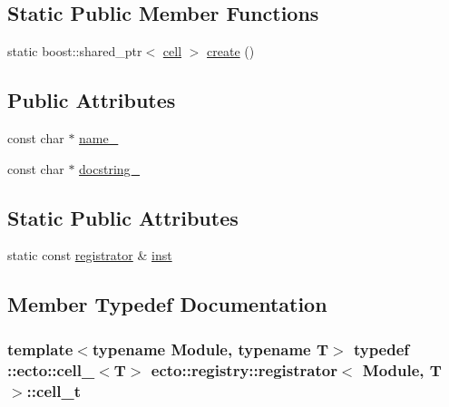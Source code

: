 \subsection*{Static Public Member Functions}
\begin{DoxyCompactItemize}
\item 
static boost\+::shared\+\_\+ptr$<$ \hyperlink{structecto_1_1cell}{cell} $>$ \hyperlink{structecto_1_1registry_1_1registrator_aa46347f24e15fcc5955523d5e2adadf7}{create} ()
\end{DoxyCompactItemize}
\subsection*{Public Attributes}
\begin{DoxyCompactItemize}
\item 
const char $\ast$ \hyperlink{structecto_1_1registry_1_1registrator_a794acc964cefc0a374129823b4ee5246}{name\+\_\+}
\item 
const char $\ast$ \hyperlink{structecto_1_1registry_1_1registrator_a6eb361c892595a3d71ab627829c07bdb}{docstring\+\_\+}
\end{DoxyCompactItemize}
\subsection*{Static Public Attributes}
\begin{DoxyCompactItemize}
\item 
static const \hyperlink{structecto_1_1registry_1_1registrator}{registrator} \& \hyperlink{structecto_1_1registry_1_1registrator_a0b0f6e3aa1718476b962a007786e7496}{inst}
\end{DoxyCompactItemize}


\subsection{Member Typedef Documentation}
\hypertarget{structecto_1_1registry_1_1registrator_ae352ebfb18c87dc7fb3f649ecbe445fa}{}
\subsubsection[{cell\+\_\+t}]{\setlength{\rightskip}{0pt plus 5cm}template$<$typename Module, typename T$>$ typedef \+::{\bf ecto\+::cell\+\_\+}$<$T$>$ {\bf ecto\+::registry\+::registrator}$<$ Module, T $>$\+::{\bf cell\+\_\+t}}\label{structecto_1_1registry_1_1registrator_ae352ebfb18c87dc7fb3f649ecbe445fa}


